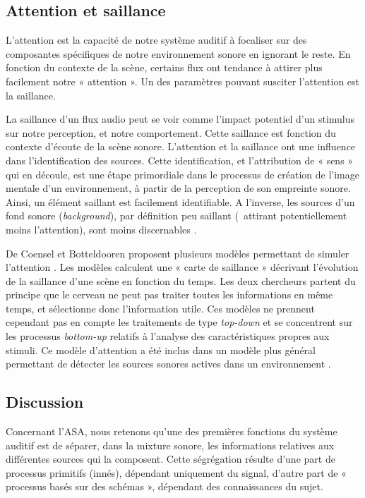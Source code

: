 \subsection{Attention et saillance}

L'attention est la capacité de notre système auditif à focaliser sur des composantes spécifiques de notre environnement sonore en ignorant le reste. En fonction du contexte de la scène, certains flux ont tendance à attirer plus facilement notre « attention ». Un des paramètres pouvant susciter l’attention est la saillance.

La saillance d'un flux audio peut se voir comme l’impact potentiel d’un stimulus sur notre perception, et notre comportement. Cette saillance est fonction du contexte d'écoute de la scène sonore. L’attention et la saillance ont une influence dans l’identification des sources. Cette identification, et l'attribution de « sens » qui en découle, est une étape primordiale dans le processus de création de l’image mentale d’un environnement, à partir de la perception de son empreinte sonore. Ainsi, un élément saillant est facilement identifiable. A l'inverse, les sources d'un fond sonore (\emph{background}), par définition peu saillant (\ie~attirant potentiellement moins l’attention), sont moins discernables \citep{elhilali2009interaction}.

De Coensel et Botteldooren proposent plusieurs modèles permettant de simuler l’attention \citep{botteldooren2009role,de2010model,de2010application}. Les modèles calculent une « carte de saillance » décrivant l’évolution de la saillance d’une scène en fonction du temps. Les deux chercheurs partent du principe que le cerveau ne peut pas traiter toutes les informations en même temps, et sélectionne donc l'information utile. Ces modèles ne prennent cependant pas en compte les traitements de type \emph{top-down} et se concentrent sur les processus \emph{bottom-up} relatifs à l’analyse des caractéristiques propres aux stimuli. Ce modèle d'attention a été inclus dans un modèle plus général permettant de détecter les sources sonores actives dans un environnement \citep{oldoni2012computational,oldoni2013computational}. 

\subsection{Discussion}

Concernant l'ASA, nous retenons qu'une des premières fonctions du système auditif est de séparer, dans la mixture sonore, les informations relatives aux différentes sources qui la composent. Cette ségrégation résulte d'une part de processus primitifs (innés), dépendant uniquement du signal, d'autre part de « processus basés sur des schémas », dépendant des connaissances du sujet. 

